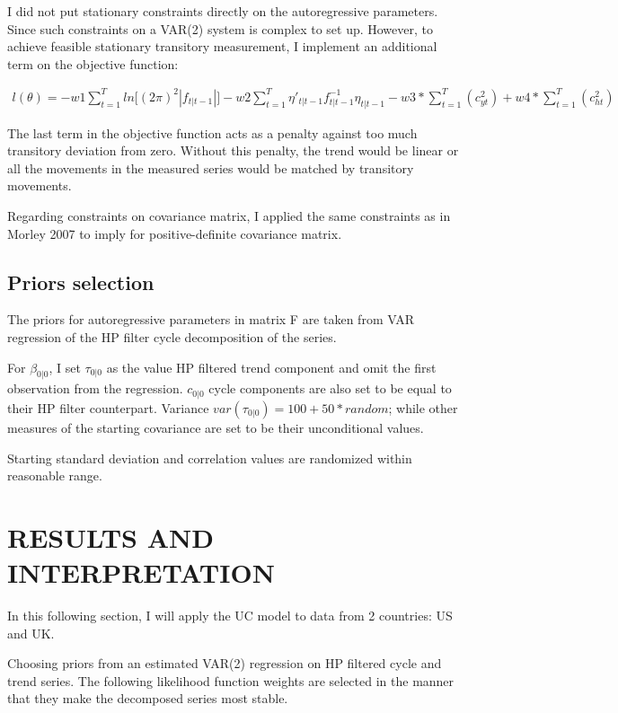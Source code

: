 \documentclass[12pt]{article}
\begin{document}
\begin{outline}[enumerate]
I did not put stationary constraints directly on the autoregressive parameters. Since such constraints on a VAR(2) system is complex to set up. However, to achieve feasible stationary transitory measurement, I implement an additional term on the objective function:

\begin{align}
l(\theta) = -w1\sum_{t=1}^{T}ln\lbrack(2\pi)^2|f_{t|t-1}|\rbrack
-w2\sum_{t=1}^{T}\eta'_{t|t-1}f^{-1}_{t|t-1}\eta_{t|t-1}
- w3*\sum_{t=1}^{T}(c_{yt}^2) + w4*\sum_{t=1}^{T}(c_{ht}^2)
\end{align}

The last term in the objective function acts as a penalty against too much transitory deviation from zero. Without this penalty, the trend would be linear or all the movements in the measured series would be matched by transitory movements.


Regarding constraints on covariance matrix, I applied the same constraints as in Morley 2007 to imply for positive-definite covariance matrix.


\subsection{Priors selection}

The priors for autoregressive parameters in matrix F are taken from VAR regression of the HP filter cycle decomposition of the series.

For $\beta_{0|0}$, I set $\tau_{0|0}$ as the value HP filtered trend component and omit the first observation from the regression. $c_{0|0}$ cycle components are also set to be equal to their HP filter counterpart. Variance $var(\tau_{0|0}) =100+50*random$; while other measures of the starting covariance are set to be their unconditional values.

Starting standard deviation and correlation values are randomized within reasonable range.

		
\section{RESULTS AND INTERPRETATION}
		
		In this following section, I will apply the UC model to data from 2 countries: US and UK.
		
Choosing priors from an estimated VAR(2) regression on HP filtered cycle and trend series. The following likelihood function weights are selected in the manner that they make the decomposed series most stable. 
		

\end{outline}
\end{document}
